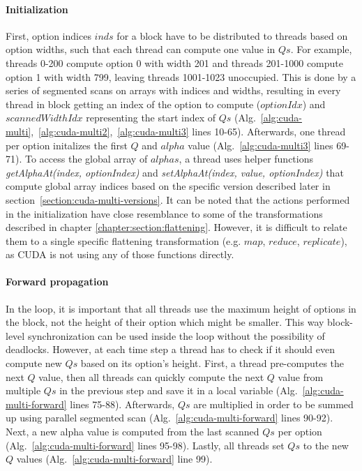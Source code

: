 \paragraph{Initialization}
First, option indices $\mathit{inds}$ for a block have to be distributed to threads based on option widths, such that each thread can compute one value in $\mathit{Qs}$. For example, threads 0-200 compute option 0 with width 201 and threads 201-1000 compute option 1 with width 799, leaving threads 1001-1023 unoccupied. This is done by a series of segmented scans on arrays with indices and widths, resulting in every thread in block getting an index of the option to compute ($\mathit{optionIdx}$) and $\mathit{scannedWidthIdx}$ representing the start index of $\mathit{Qs}$ (Alg.~\ref{alg:cuda-multi},~\ref{alg:cuda-multi2},~\ref{alg:cuda-multi3} lines 10-65). Afterwards, one thread per option initalizes the first $Q$ and $\mathit{alpha}$ value (Alg.~\ref{alg:cuda-multi3} lines 69-71). To access the global array of $\mathit{alphas}$, a thread uses helper functions \emph{getAlphaAt(index, optionIndex)} and \emph{setAlphaAt(index, value, optionIndex)} that compute global array indices based on the specific version described later in section~\ref{section:cuda-multi-versions}. It can be noted that the actions performed in the initialization have close resemblance to some of the transformations described in chapter \ref{chapter:section:flattening}. However, it is difficult to relate them to a single specific flattening transformation (e.g. $map$, $reduce$, $replicate$), as CUDA is not using any of those functions directly.

\paragraph{Forward propagation}
In the loop, it is important that all threads use the maximum height of options in the block, not the height of their option which might be smaller. This way block-level synchronization can be used inside the loop without the possibility of deadlocks. However, at each time step a thread has to check if it should even compute new $\mathit{Qs}$ based on its option's height. First, a thread pre-computes the next $Q$ value, then all threads can quickly compute the next $Q$ value from multiple $\mathit{Qs}$ in the previous step and save it in a local variable (Alg.~\ref{alg:cuda-multi-forward} lines 75-88). Afterwards, $\mathit{Qs}$ are multiplied in order to be summed up using parallel segmented scan (Alg.~\ref{alg:cuda-multi-forward} lines 90-92). Next, a new alpha value is computed from the last scanned $Qs$ per option (Alg.~\ref{alg:cuda-multi-forward} lines 95-98). Lastly, all threads set $\mathit{Qs}$ to the new $Q$ values (Alg.~\ref{alg:cuda-multi-forward} line 99).

